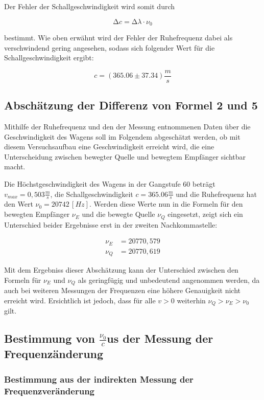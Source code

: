 Der Fehler der Schallgeschwindigkeit wird somit durch

\begin{equation}
  \increment c = \increment \lambda \cdot \nu_0
\end{equation}

bestimmt. Wie oben erwähnt wird der Fehler der Ruhefrequenz dabei als verschwindend gering
angesehen, sodass sich folgender Wert für die Schallgeschwindigkeit ergibt:

\begin{equation}
  c = (365.06 \pm 37.34) \frac{m}{s}
\end{equation}

\subsection{Abschätzung der Differenz von Formel 2 und 5}

Mithilfe der Ruhefrequenz und den der Messung entnommenen Daten über die
Geschwindigkeit des Wagens soll im Folgendem abgeschätzt werden, ob mit diesem Versuchsaufbau
eine Geschwindigkeit erreicht wird, die eine Unterscheidung zwischen bewegter Quelle und
bewegtem Empfänger sichtbar macht.

Die Höchstgeschwindigkeit des Wagens in der Gangstufe 60 beträgt $v_{max} = 0,503 \frac{m}{s}$,
die Schallgeschwindigkeit $c = 365.06 \frac{m}{s}$ und die Ruhefrequenz hat den Wert $\nu_0 = 20742 \, [Hz]$.
Werden diese Werte nun in die Formeln für den bewegten Empfänger $\nu_E$ und die bewegte Quelle
$\nu_Q$ eingesetzt, zeigt sich ein Unterschied beider Ergebnisse erst in der zweiten Nachkommastelle:

\begin{align}
  \nu_E &= 20770,579\\
  \nu_Q &= 20770,619
\end{align}

Mit dem Ergebniss dieser Abschätzung kann der Unterschied zwischen den Formeln für $\nu_E$ und
$\nu_Q$ als geringfügig und unbedeutend angenommen werden, da auch bei weiteren Messungen der
Frequenzen eine höhere Genauigkeit nicht erreicht wird. Ersichtlich ist jedoch, dass für alle
$v>0$ weiterhin $\nu_Q > \nu_E > \nu_0$ gilt.

\subsection{Bestimmung von \texorpdfstring{$\frac{\nu_0}{c}$} aus der Messung der Frequenzänderung}
\subsubsection{Bestimmung aus der indirekten Messung der Frequenzveränderung}

